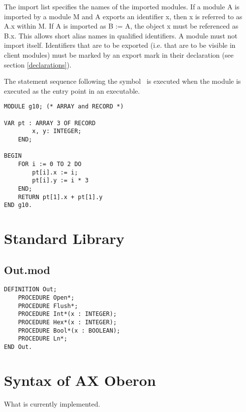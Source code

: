 \documentclass[12pt]{article}
\begin{document}
The import list specifies the names of the imported modules. If a module A is imported by a module M and A exports an identifier x, then x is referred to as A.x within M. If A is imported as B := A, the object x must be referenced as B.x. This allows short alias names in qualified identifiers. A module must not import itself. Identifiers that are to be exported (i.e. that are to be visible in client modules) must be marked by an export mark in their declaration (see section \ref{declarations}).


The statement sequence following the symbol \BEGIN\ is executed when the module is executed as the entry point in an executable.

\begin{lstlisting}[style=oberon]
MODULE g10; (* ARRAY and RECORD *)
    
VAR pt : ARRAY 3 OF RECORD
        x, y: INTEGER;
    END;

BEGIN
    FOR i := 0 TO 2 DO
        pt[i].x := i;
        pt[i].y := i * 3
    END;
    RETURN pt[1].x + pt[1].y
END g10.    
\end{lstlisting} 

\section{Standard Library}

\subsection{Out.mod}

\begin{lstlisting}[style=oberon]
DEFINITION Out;
    PROCEDURE Open*;
    PROCEDURE Flush*;
    PROCEDURE Int*(x : INTEGER);
    PROCEDURE Hex*(x : INTEGER);
    PROCEDURE Bool*(x : BOOLEAN);
    PROCEDURE Ln*;
END Out.
\end{lstlisting} 


\newpage
\appendix

\section{Syntax of AX Oberon}

What is currently implemented.
\end{document}
